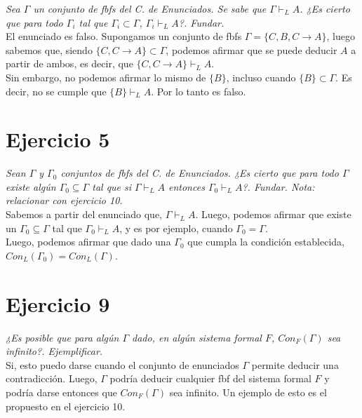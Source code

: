 \documentclass[osajnl,twocolumn,showpacs,superscriptaddress,10pt,leqno]{revtex4-1} %
\begin{document}
\textit{Sea $\Gamma$ un conjunto de fbfs del C. de Enunciados. Se sabe que $\Gamma \vdash_L A$. ¿Es cierto que para todo $\Gamma_i$ tal que $\Gamma_i \subset \Gamma$, $\Gamma_i \vdash_L A$?. Fundar.} \\

El enunciado es falso. Supongamos un conjunto de fbfs $\Gamma = \{ C, B, C \rightarrow A \}$,
luego sabemos que, siendo $\{ C, C \rightarrow A \} \subset \Gamma$, podemos afirmar que se puede deducir
$A$ a partir de ambos, es decir, que $\{ C, C \rightarrow A \} \vdash_L A$. \\

Sin embargo, no podemos afirmar lo mismo de $\{ B \}$, incluso cuando $\{ B \} \subset \Gamma$. Es decir,
no se cumple que $\{ B \} \vdash_L A$. Por lo tanto es falso.

\section{Ejercicio 5}

\textit{Sean $\Gamma$ y $\Gamma_0$ conjuntos de fbfs del C. de Enunciados. ¿Es cierto que para todo $\Gamma$ existe algún $\Gamma_0 \subseteq \Gamma$ tal que si $\Gamma \vdash_L A$ entonces $\Gamma_0 \vdash_L A$?. Fundar. Nota: relacionar con ejercicio 10.} \\

Sabemos a partir del enunciado que, $\Gamma \vdash_L A$. Luego, podemos afirmar que existe un $\Gamma_0 \subseteq \Gamma$ tal que $\Gamma_0 \vdash_L A$, y es por ejemplo, cuando $\Gamma_0 = \Gamma$. \\

Luego, podemos afirmar que dado una $\Gamma_0$ que cumpla la condición establecida, $Con_L(\Gamma_0) = Con_L(\Gamma)$.

\section{Ejercicio 9}

\textit{¿Es posible que para algún $\Gamma$ dado, en algún sistema formal $F$, $Con_F(\Gamma)$ sea
infinito?. Ejemplificar.} \\

Si, esto puedo darse cuando el conjunto de enunciados $\Gamma$ permite deducir una contradicción. Luego, $\Gamma$ podría deducir
cualquier fbf del sistema formal $F$ y podría darse entonces que $Con_F(\Gamma)$ sea infinito. Un ejemplo de esto es el propuesto en el ejercicio 10.
\end{document}
